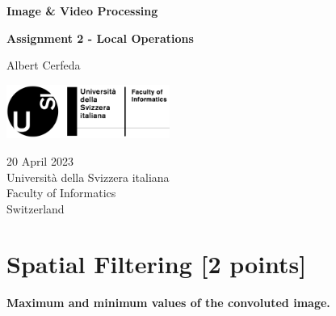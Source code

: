 \documentclass[tikz,14pt,fleqn]{article}
\newcommand\namesurname{Albert Cerfeda}
\newcommand\assignment{Assignment 2 - Local Operations}
\newcommand\subject{Image \& Video Processing}
\newcommand\documentdate{20 April 2023}
\begin{document}
\begin{titlepage}
   \begin{center}
       \vspace*{0.2cm}

       \textbf{\Large{\subject}}

       \vspace{0.5cm}
        \textbf{\assignment}\\[5mm]
        
            
       \vspace{0.4cm}

        \namesurname
        \begin{figure}[H]
            \centering
        \end{figure}
       \tableofcontents

       \vspace*{\fill}
     
        \includegraphics[width=0.4\textwidth]{fig/logo.png}
       
        \documentdate \\
        Università della Svizzera italiana\\
        Faculty of Informatics\\
        Switzerland\\

   \end{center}
\end{titlepage}

\section{Spatial Filtering [2 points]}

\textbf{Maximum and minimum values of the convoluted image.}
\end{document}
